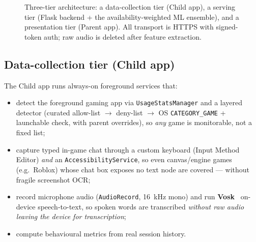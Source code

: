 \documentclass[11pt,a4paper]{article}
\begin{document}
\begin{figure}[h]
\caption{Three-tier architecture: a data-collection tier (Child app), a serving tier
(Flask backend + the availability-weighted ML ensemble), and a presentation tier
(Parent app). All transport is HTTPS with signed-token auth; raw audio is deleted after
feature extraction.}
\label{fig:arch}
\end{figure}

\subsection{Data-collection tier (Child app)}
The Child app runs always-on foreground services that:
\begin{itemize}[leftmargin=1.4em]
  \item detect the foreground gaming app via \texttt{UsageStatsManager} and a
        layered detector (curated allow-list $\rightarrow$ deny-list $\rightarrow$
        OS \texttt{CATEGORY\_GAME} + launchable check, with parent overrides), so
        \emph{any} game is monitorable, not a fixed list;
  \item capture typed in-game chat through a custom keyboard (Input Method Editor)
        \emph{and} an \texttt{AccessibilityService}, so even canvas/engine games
        (e.g.\ Roblox) whose chat box exposes no text node are covered --- without
        fragile screenshot OCR;
  \item record microphone audio (\texttt{AudioRecord}, 16~kHz mono) and run
        \textbf{Vosk}~\cite{vosk,kaldi2011} on-device speech-to-text, so spoken words are transcribed
        \emph{without raw audio leaving the device for transcription};
  \item compute behavioural metrics from real session history.
\end{itemize}
\end{document}
